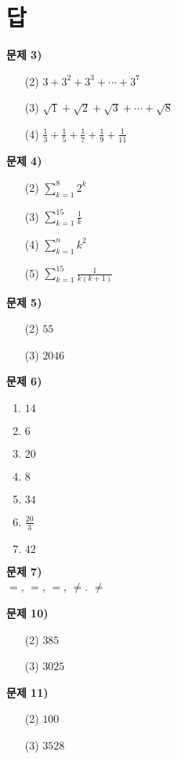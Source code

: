 \documentclass{oblivoir}
\newcounter{num}
\newcommand\an[1]{\par\bigskip\noindent\textbf{문제 #1)}\\}
\newcommand\summ[4]{\ensuremath{\displaystyle\sum_{#1=#2}^{#3}#4}}
\let\oldsection\section
\renewcommand\section{\clearpage\oldsection}
\begin{document}
\section*{답}
\begin{minipage}{0.49\textwidth}
%
\an{3}
\begin{enumerate}[topsep=0pt]
\item[(2)]
\(3+3^2+3^3+\cdots+3^7\)
\item[(3)]
\(\sqrt1+\sqrt2+\sqrt3+\cdots+\sqrt8\)
\item[(4)]
\(\frac13+\frac15+\frac17+\frac19+\frac1{11}\)
\end{enumerate}

%
\an{4}
\begin{enumerate}[topsep=0pt]
\item[(2)]
\summ k18{2^k}
\item[(3)]
\summ k1{15}{\frac1k}
\item[(4)]
\summ k1n{k^2}
\item[(5)]
\summ k1{15}{\frac1{k(k+1)}}
\end{enumerate}

%
\an{5}
\begin{enumerate}[topsep=0pt]
\item[(2)]
\(55\)
\item[(3)]
\(2046\)
\end{enumerate}
\end{minipage}
\begin{minipage}{0.49\textwidth}

%
\an{6}
\begin{enumerate}[topsep=0pt]
\item
\(14\)
\item
\(6\)
\item
\(20\)
\item
\(8\)
\item
\(34\)
\item
\(\frac{20}3\)
\item
\(42\)
\end{enumerate}

%
\an{7}
\(=\), \(=\), \(=\), \(\neq\). \(\neq\)

%
\an{10}
\begin{enumerate}
\item[(2)]
\(385\)
\item[(3)]
\(3025\)
\end{enumerate}

%
\an{11}
\begin{enumerate}
\item[(2)]
\(100\)
\item[(3)]
\(3528\)
\end{enumerate}

\end{minipage}
\end{document}
